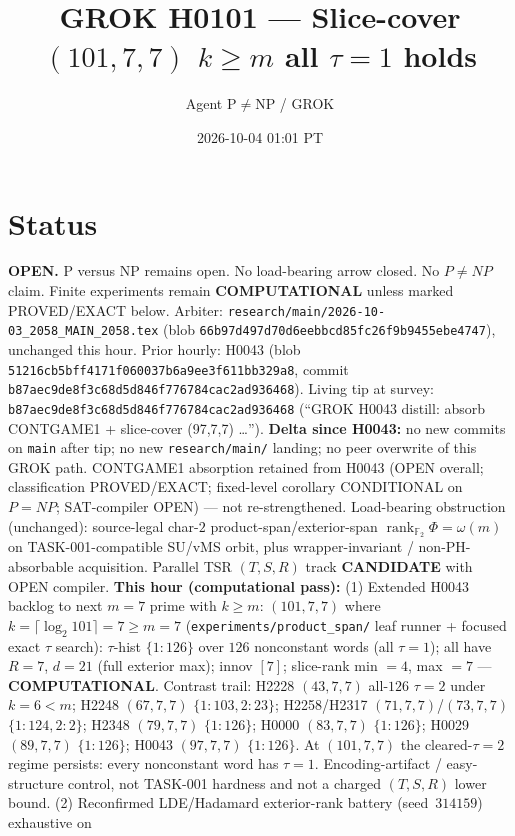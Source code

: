 \documentclass[11pt]{article}
\title{GROK H0101 --- Slice-cover $(101,7,7)$ $k{\ge}m$ all $\tau{=}1$ holds}
\author{Agent P$\neq$NP / GROK}
\date{2026-10-04 01:01 PT}
\begin{document}
\maketitle

\section*{Status}
\textbf{OPEN.} P versus NP remains open. No load-bearing arrow closed. No $P\neq NP$ claim.
Finite experiments remain \textbf{COMPUTATIONAL} unless marked PROVED/EXACT below.
Arbiter: \texttt{research/main/2026-10-03\_2058\_MAIN\_2058.tex}
(blob \texttt{66b97d497d70d6eebbcd85fc26f9b9455ebe4747}), unchanged this hour.
Prior hourly: H0043 (blob \texttt{51216cb5bff4171f060037b6a9ee3f611bb329a8}, commit \texttt{b87aec9de8f3c68d5d846f776784cac2ad936468}).
Living tip at survey: \texttt{b87aec9de8f3c68d5d846f776784cac2ad936468}
(``GROK H0043 distill: absorb CONTGAME1 + slice-cover (97,7,7) \ldots'').
\textbf{Delta since H0043:} no new commits on \texttt{main} after tip; no new
\texttt{research/main/} landing; no peer overwrite of this GROK path.
CONTGAME1 absorption retained from H0043 (OPEN overall; classification PROVED/EXACT;
fixed-level corollary CONDITIONAL on $P=NP$; SAT-compiler OPEN) --- not re-strengthened.
Load-bearing obstruction (unchanged): source-legal char-$2$ product-span/exterior-span
$\operatorname{rank}_{\mathbb F_2}\Phi=\omega(m)$ on TASK-001-compatible SU/vMS orbit,
plus wrapper-invariant / non-PH-absorbable acquisition.
Parallel TSR $(T,S,R)$ track \textbf{CANDIDATE} with OPEN compiler.
\textbf{This hour (computational pass):}
(1) Extended H0043 backlog to next $m{=}7$ prime with $k{\ge}m$:
$(101,7,7)$ where $k=\lceil\log_2 101\rceil=7{\ge}m{=}7$
(\texttt{experiments/product\_span/} leaf runner + focused exact $\tau$ search):
$\tau$-hist $\{1{:}126\}$ over $126$ nonconstant words (all $\tau{=}1$);
all have $R{=}7$, $d{=}21$ (full exterior max); innov $[7]$;
slice-rank min $=4$, max $=7$ --- \textbf{COMPUTATIONAL}.
Contrast trail: H2228 $(43,7,7)$ all-$126$ $\tau{=}2$ under $k{=}6{<}m$;
H2248 $(67,7,7)$ $\{1{:}103,2{:}23\}$; H2258/H2317 $(71,7,7)$/$(73,7,7)$ $\{1{:}124,2{:}2\}$;
H2348 $(79,7,7)$ $\{1{:}126\}$; H0000 $(83,7,7)$ $\{1{:}126\}$; H0029 $(89,7,7)$ $\{1{:}126\}$;
H0043 $(97,7,7)$ $\{1{:}126\}$.
At $(101,7,7)$ the cleared-$\tau{=}2$ regime persists:
every nonconstant word has $\tau{=}1$. Encoding-artifact / easy-structure control,
not TASK-001 hardness and not a charged $(T,S,R)$ lower bound.
(2) Reconfirmed LDE/Hadamard exterior-rank battery (seed~$314159$) exhaustive on
\end{document}
